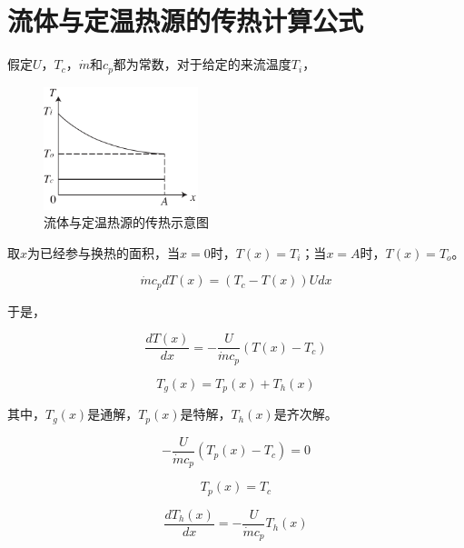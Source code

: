 \appendix

\chapter{流体与定温热源的传热计算公式}
\label{cha:CTHX}
假定$U$，$T_{c}$，$\dot{m}$和$c_{p}$都为常数，对于给定的来流温度$T_{i}$，

\begin{figure}[h]
\begin{centering}
\includegraphics[width=0.4\textwidth]{fig/ConstTempHX.pdf}
\par\end{centering}
\caption{流体与定温热源的传热示意图}
\label{fig:CTHX}
\end{figure}

取$x$为已经参与换热的面积，当$x=0$时，$T(x)=T_i$；当$x=A$时，$T(x)=T_o$。

\begin{equation}
\dot{m}c_{p}dT(x)=(T_{c}-T(x))Udx
\end{equation}

于是，

\begin{equation}
\frac{dT(x)}{dx}=-\frac{U}{\dot{m}c_{p}}(T(x)-T_{c})
\end{equation}

\begin{equation}
T_{g}(x)=T_{p}(x)+T_{h}(x)
\end{equation}

其中，$T_{g}(x)$是通解，$T_{p}(x)$是特解，$T_{h}(x)$是齐次解。

\begin{equation}
-\frac{U}{\dot{m}c_{p}}(T_{p}(x)-T_{c})=0
\end{equation}

\begin{equation}
T_{p}(x)=T_{c}
\end{equation}

\begin{equation}
\frac{dT_{h}(x)}{dx}=-\frac{U}{\dot{m}c_{p}}T_{h}(x)\label{eq:T_h(x)}
\end{equation}

